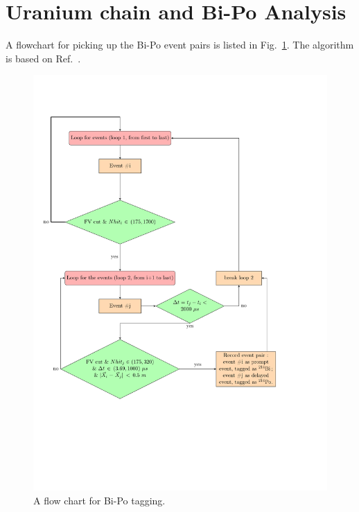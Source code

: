 \section{Uranium chain and Bi-Po Analysis}\label{appendix:bipo}
A flowchart for picking up the Bi-Po event pairs is listed in Fig.~\ref{biPo_flowchart}. The algorithm is based on Ref.~\cite{joshW1}.
 
\begin{figure}[!htb]
	\centering
	\includegraphics[width=15cm]{flowchart_latex.pdf}
	\caption{A flow chart for Bi-Po tagging.}
	\label{biPo_flowchart}
\end{figure}